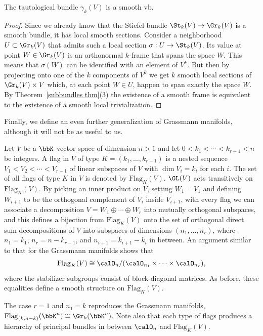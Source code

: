 \begin{prop}
    The tautological bundle $\gamma_k(V)$ is a smooth \gls{vb}.
\end{prop}
\begin{proof}
    Since we already know that the Stiefel bundle $\St_k(V)\to \Gr_k(V)$ is a smooth bundle, it has local smooth sections. Consider a neighborhood $U\subset \Gr_k(V)$ that admits such a local section $\sigma:U\to \St_k(V)$. Its value at point $W\in \Gr_k(V)$ is an orthonormal $k$-frame that spans the space $W$. This means that $\sigma(W)$ can be identified with an element of $V^k$. But then by projecting onto one of the $k$ components of $V^k$ we get $k$ smooth local sections of $\Gr_k(V)\times V$ which, at each point $W\in U$, happen to span exactly the space $W$. By Theorem~\ref{subbundles thm}(3) the existence of a smooth frame is equivalent to the existence of a smooth local trivialization.
\end{proof}

Finally, we define an even further generalization of Grassmann manifolds, although it will not be as useful to us.

\begin{defn}
    Let $V$ be a $\bbK$-vector space of dimension $n>1$ and let $0<k_1<\cdots<k_{r-1}<n$ be integers. A flag in $V$ of type $K=(k_1,\ldots,k_{r-1})$ is a nested sequence $V_1< V_2< \cdots < V_{r-1}$ of linear subspaces of $V$ with $\dim V_i=k_i$ for each $i$. The set of all flags of type $K$ in $V$ is denoted by $\mathrm{Flag}_K(V)$. $\GL(V)$ acts transitively on $\mathrm{Flag}_K(V)$. By picking an inner product on $V$, setting $W_1=V_1$ and defining $W_{i+1}$ to be the orthogonal complement of $V_i$ inside $V_{i+1}$, with every flag we can associate a decomposition $V=W_1\oplus \cdots\oplus W_r$ into mutually orthogonal subspaces, and this defines a bijection from $\mathrm{Flag}_K(V)$ onto the set of orthogonal direct sum decompositions of $V$ into subspaces of dimensions $(n_1,\ldots,n_r)$, where $n_1=k_1$, $n_r=n-k_{r-1}$, and $n_{i+1}=k_{i+1}-k_i$ in between. An argument similar to that for the Grassmann manifolds shows that
    \[\mathrm{Flag}_K(V)\cong \calO_n\slash (\calO_{n_1}\times\cdots\times\calO_{n_r}),\]
    where the stabilizer subgroups consist of block-diagonal matrices. As before, these equalities define a smooth structure on $\mathrm{Flag}_K(V)$.
\end{defn}

The case $r=1$ and $n_1=k$ reproduces the Grassmann manifolds, $\mathrm{Flag}_{(k,n-k)}(\bbK^n)\cong \Gr_k(\bbK^n)$. Note also that each type of flags produces a hierarchy of principal bundles in between $\calO_n$ and $\mathrm{Flag}_K(V)$.








